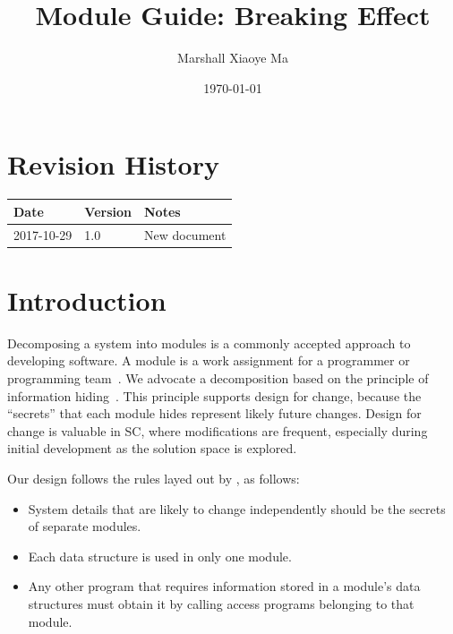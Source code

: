 \documentclass[12pt, titlepage]{article}
\begin{document}
	
	\title{Module Guide: Breaking Effect} 
	\author{Marshall Xiaoye Ma}
	\date{\today}
	
	\maketitle
	
	
	\section{Revision History}
	
	\begin{tabularx}{\textwidth}{p{3cm}p{2cm}X}
		\toprule {\bf Date} & {\bf Version} & {\bf Notes}\\
		\midrule
		2017-10-29 & 1.0 & New document\\
		\bottomrule
	\end{tabularx}
	
	\newpage
	
	\tableofcontents
	
	\listoftables
	
	\listoffigures
	
	\newpage
	
	
	\section{Introduction}
	
	Decomposing a system into modules is a commonly accepted approach to developing
	software.  A module is a work assignment for a programmer or programming
	team~\citep{ParnasEtAl1984}.  We advocate a decomposition
	based on the principle of information hiding~\citep{Parnas1972a}.  This
	principle supports design for change, because the ``secrets'' that each module
	hides represent likely future changes.  Design for change is valuable in SC,
	where modifications are frequent, especially during initial development as the
	solution space is explored.  
	
	Our design follows the rules layed out by \citet{ParnasEtAl1984}, as follows:
	\begin{itemize}
		\item System details that are likely to change independently should be the
		secrets of separate modules.
		\item Each data structure is used in only one module.
		\item Any other program that requires information stored in a module's data
		structures must obtain it by calling access programs belonging to that module.
	\end{itemize}
	
\end{document}
